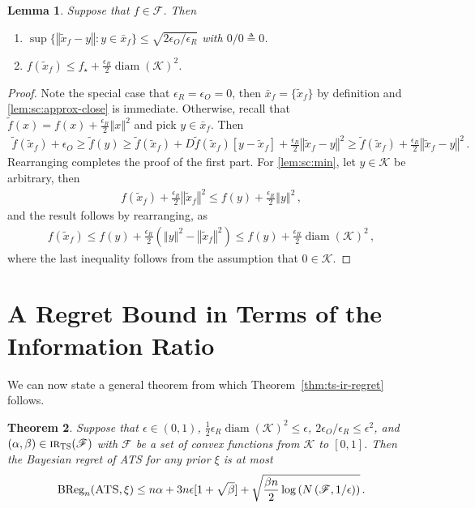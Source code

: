 \documentclass[letter, 12pt]{report}
\newcommand{\epsR}{{\epsilon_R}}
\newcommand{\epsO}{{\epsilon_O}}
\newcommand{\BReg}{\textrm{BReg}}
\newcommand{\norm}[1]{\left \Vert  #1 \right \Vert}
\newcommand{\cK}{\mathcal K}
\newcommand{\sF}{\mathscr F}
\newcommand{\diam}{\operatorname{diam}}
\newcommand{\1}{\mathbf{1}}
\newcommand{\IR}{\operatorname{\textsc{ir}}}
\newcommand{\ts}{\textsc{TS}\xspace}
\newcommand{\ats}{\textsc{ATS}}
\theoremstyle{plain}
\newtheorem{theorem}{Theorem}
\newtheorem{lemma}[theorem]{Lemma}
\theoremstyle{definition}
\theoremstyle{remark}
\begin{document}
\begin{lemma}\label{lem:sc}
    Suppose that $f \in \sF$.
    Then
    \begin{enumerate}
        \item $\sup \{\norm{\tilde x_f - y} : y \in \bar x_f\} \leq \sqrt{2\epsO / \epsR}$ with $0/0 \triangleq 0$. \label{lem:sc:approx-close}
        \item $f(\tilde x_f) \leq f_\star + \frac{\epsR}{2} \diam(\cK)^2$. \label{lem:sc:min}
    \end{enumerate}
\end{lemma}

\begin{proof}
    Note the special case that $\epsR = \epsO = 0$, then $\bar x_f = \{\tilde x_f\}$ by definition and \ref{lem:sc:approx-close} is immediate.
    Otherwise, recall that $\tilde f(x) = f(x) + \frac{\epsR}{2} \norm{x}^2$ and pick $y \in \bar x_f$. Then
    \begin{align*}
        \tilde f(\tilde x_f) + \epsO
        \geq \tilde f(y)
        \geq \tilde f(\tilde x_f) + D\tilde f(\tilde x_f)[y - \tilde x_f] + \frac{\epsR}{2} \norm{\tilde x_f - y}^2
        \geq \tilde f(\tilde x_f) + \frac{\epsR}{2} \norm{\tilde x_f - y}^2 \,.
    \end{align*}
    Rearranging completes the proof of the first part.
    For \ref{lem:sc:min}, let $y \in \cK$ be arbitrary, then
    \begin{align*}
        f(\tilde x_f) + \frac{\epsR}{2} \norm{\tilde x_f}^2 \leq f(y) + \frac{\epsR}{2} \norm{y}^2  \,,
    \end{align*}
    and the result follows by rearranging, as
    \begin{align*}
        f(\tilde x_f)
        \leq f(y) + \frac{\epsR}{2}(\norm{y}^2 - \norm{\tilde x_f}^2)
        \leq f(y) + \frac{\epsR}{2} \diam(\cK)^2 \,,
    \end{align*}
    where the last inequality follows from the assumption that $ 0 \in \cK$.
\end{proof}


\section{A Regret Bound in Terms of the Information Ratio}\label{sec:ir-general}
We can now state a general theorem from which Theorem~\ref{thm:ts-ir-regret} follows.

\begin{theorem}\label{thm:ir-general}
    Suppose that $\epsilon \in (0,1)$, $\frac{1}{2} \epsR \diam(\cK)^2 \leq \epsilon$, $2\epsO/\epsR \leq \epsilon^2$, and $(\alpha, \beta) \in \IR_\ts(\sF)$ with $\sF$ be a set of convex functions from $\cK$ to $[0,1]$.
    Then the Bayesian regret of \ats{} for any prior $\xi$ is at most
    \begin{align*}
        \BReg_n(\ats, \xi) \leq n \alpha + 3n\epsilon[1 + \sqrt{\beta}] + \sqrt{\frac{\beta n}{2} \log\left(N\left(\sF, 1/\epsilon\right)\right)} \,.
    \end{align*}
\end{theorem}
\end{document}

